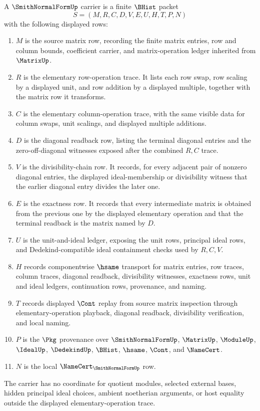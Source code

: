 \begin{definition}
\label{def:smith-normal-form-carrier}
A $\SmithNormalFormUp$ carrier is a finite $\BHist$ packet
$$
S=(M,R,C,D,V,E,U,H,T,P,N)
$$
with the following displayed rows:
\begin{enumerate}
\item $M$ is the source matrix row, recording the finite matrix entries, row and column bounds, coefficient carrier, and matrix-operation ledger inherited from $\MatrixUp$.
\item $R$ is the elementary row-operation trace. It lists each row swap, row scaling by a displayed unit, and row addition by a displayed multiple, together with the matrix row it transforms.
\item $C$ is the elementary column-operation trace, with the same visible data for column swaps, unit scalings, and displayed multiple additions.
\item $D$ is the diagonal readback row, listing the terminal diagonal entries and the zero-off-diagonal witnesses exposed after the combined $R,C$ trace.
\item $V$ is the divisibility-chain row. It records, for every adjacent pair of nonzero diagonal entries, the displayed ideal-membership or divisibility witness that the earlier diagonal entry divides the later one.
\item $E$ is the exactness row. It records that every intermediate matrix is obtained from the previous one by the displayed elementary operation and that the terminal readback is the matrix named by $D$.
\item $U$ is the unit-and-ideal ledger, exposing the unit rows, principal ideal rows, and Dedekind-compatible ideal containment checks used by $R,C,V$.
\item $H$ records componentwise $\hsame$ transport for matrix entries, row traces, column traces, diagonal readback, divisibility witnesses, exactness rows, unit and ideal ledgers, continuation rows, provenance, and naming.
\item $T$ records displayed $\Cont$ replay from source matrix inspection through elementary-operation playback, diagonal readback, divisibility verification, and local naming.
\item $P$ is the $\Pkg$ provenance over $\SmithNormalFormUp$, $\MatrixUp$, $\ModuleUp$, $\IdealUp$, $\DedekindUp$, $\BHist$, $\hsame$, $\Cont$, and $\NameCert$.
\item $N$ is the local $\NameCert_{\SmithNormalFormUp}$ row.
\end{enumerate}
The carrier has no coordinate for quotient modules, selected external bases, hidden principal ideal choices, ambient noetherian arguments, or host equality outside the displayed elementary-operation trace.
\end{definition}

